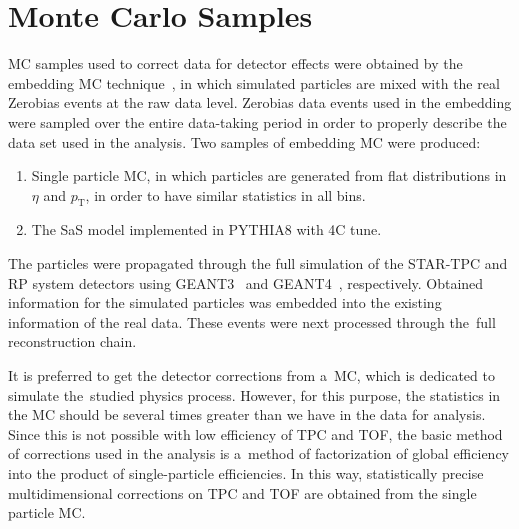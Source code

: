 \chapter{Monte Carlo Samples }\label{section:star_mc}
\ac{MC} samples used to correct data for detector effects were obtained by the embedding \ac{MC} technique~\cite{STAR:tpc}, in which  simulated particles are mixed with the real Zerobias events at the raw data level. Zerobias data events used in the embedding were sampled over the entire data-taking period in order to properly describe the data set used in the analysis.  Two samples of embedding MC were produced:
\begin{enumerate}
	\item Single particle \ac{MC}, in which particles are generated from flat distributions in $\eta$ and $p_\textrm{T}$, in order to have similar statistics in all bins.
	\item The \ac{SaS} model implemented in PYTHIA8 with 4C tune. 
\end{enumerate}
The particles were propagated through the full simulation of the STAR-TPC and RP system detectors using GEANT3~\cite{GEANT:three} and GEANT4~\cite{GEANT:four}, respectively. Obtained information for the simulated particles was embedded into the existing information of the real data. These events were next processed through the~full reconstruction chain. 

It is preferred to get the detector corrections from a~MC, which is dedicated to simulate the~studied  physics process. However, for this purpose, the statistics in the MC should be several times greater than we have in the data for analysis. Since this is not possible with  low efficiency of TPC and TOF, the basic method of corrections used in the analysis is a~method of factorization of global efficiency into the product of single-particle efficiencies. In this way, statistically precise multidimensional corrections on TPC and TOF are obtained from the single particle MC.

